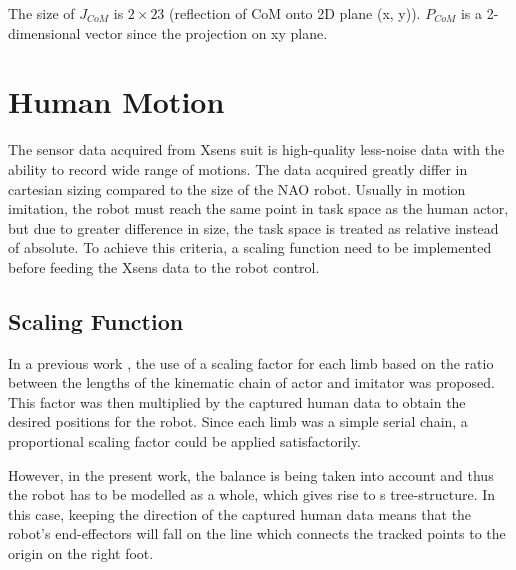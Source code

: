 The size of $J_{CoM}$ is $2 \times 23$ (reflection of CoM onto 2D plane (x, y)). $P_{CoM}$ is a 2-dimensional vector since the projection on xy plane.

\section{Human Motion}

The sensor data acquired from Xsens suit is high-quality less-noise data with the ability to record wide range of motions.
The data acquired greatly differ in cartesian sizing compared to the size of the NAO robot. Usually in motion imitation, the robot 
must reach the same point in task space as the human actor, but due to greater difference in size, the task space is treated as relative instead of absolute. 
To achieve this criteria, a scaling function need to be implemented before
feeding the Xsens data to the robot control.

\subsection{Scaling Function}

In a previous work \cite{scaling-human-nao}, the use of a scaling factor for each limb based on the ratio between the lengths of the kinematic chain of actor and 
imitator was proposed. This factor was then multiplied by the captured human data to obtain the desired positions for the robot. Since each limb 
was a simple serial chain, a proportional scaling factor could be applied satisfactorily.

However, in the present work, the balance is being taken into account and thus the robot has to be modelled as a whole, which gives rise to s 
tree-structure. In this case, keeping the direction of the captured human data means that the robot’s end-effectors will fall on the line which 
connects the tracked points to the origin on the right foot.

